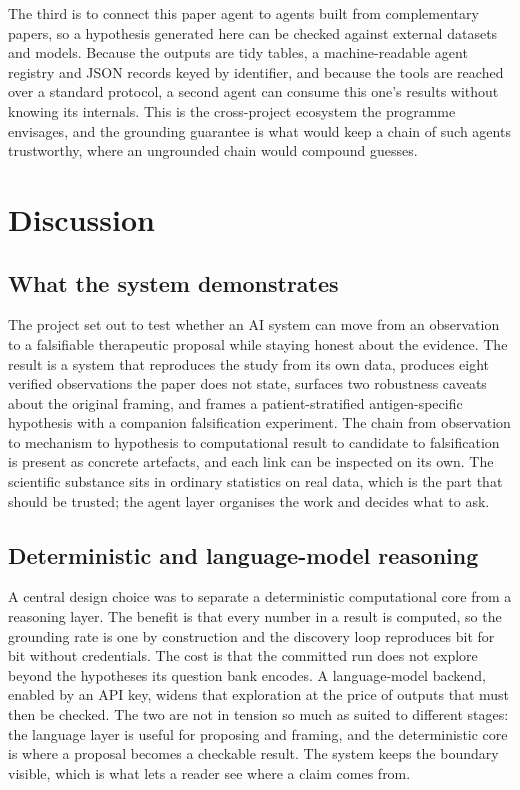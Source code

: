 \documentclass[11pt]{article}
\begin{document}
The third is to connect this paper agent to agents built from complementary papers, so a hypothesis
generated here can be checked against external datasets and models. Because the outputs are tidy
tables, a machine-readable agent registry and JSON records keyed by identifier, and because the tools
are reached over a standard protocol, a second agent can consume this one's results without knowing
its internals. This is the cross-project ecosystem the programme envisages, and the grounding
guarantee is what would keep a chain of such agents trustworthy, where an ungrounded chain would compound
guesses.

\section{Discussion}
\subsection{What the system demonstrates}
The project set out to test whether an AI system can move from an observation to a falsifiable
therapeutic proposal while staying honest about the evidence. The result is a system that reproduces
the study from its own data, produces eight verified observations the paper does not state, surfaces
two robustness caveats about the original framing, and frames a patient-stratified antigen-specific
hypothesis with a companion falsification experiment. The chain from observation to mechanism to
hypothesis to computational result to candidate to falsification is present as concrete artefacts, and each link can be inspected on its own. The scientific substance
sits in ordinary statistics on real data, which is the part that should be trusted; the agent layer
organises the work and decides what to ask.

\subsection{Deterministic and language-model reasoning}
A central design choice was to separate a deterministic computational core from a reasoning layer. The
benefit is that every number in a result is computed, so the grounding rate is one by construction and
the discovery loop reproduces bit for bit without credentials. The cost is that the committed run does
not explore beyond the hypotheses its question bank encodes. A language-model backend, enabled by an
API key, widens that exploration at the price of outputs that must then be checked. The two are not in
tension so much as suited to different stages: the language layer is useful for proposing and framing,
and the deterministic core is where a proposal becomes a checkable result. The system keeps the
boundary visible, which is what lets a reader see where a claim comes from.
\end{document}
